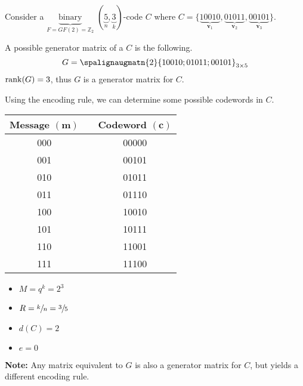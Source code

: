 
\begin{Example}{}{}
    Consider a $ \underbrace{\text{binary}}_{F=GF(2)=\mathbb{Z}_2} $
    $ (\underbrace{5}_{n},\underbrace{3}_{k}) $-code $ C $
    where
    $ C=\{\underbrace{10010}_{\bm{v}_1},\underbrace{01011}_{\bm{v}_2},\underbrace{00101}_{\bm{v}_3}\} $.

    A possible generator matrix of a $ C $ is the following.
    \[ G=
        \spalignaugmatn{2}{
            1 0 0 1 0; 0 1 0 1 1; 0 0 1 0 1}_{3\times{}5}
    \]
    $ \operatorname{rank}(G)=3 $, thus $ G $ is a generator matrix for $ C $.

    Using the encoding rule, we can determine some possible codewords in $ C $.
    \begin{table}[H]
        \centering
        \begin{tabular}{@{}ccc@{}}
            Message $ (\bm{m}) $ & \textrightarrow{} & Codeword $ (\bm{c}) $ \\
            \midrule
            000                  & \textrightarrow{} & 00000                 \\
            001                  & \textrightarrow{} & 00101                 \\
            010                  & \textrightarrow{} & 01011                 \\
            011                  & \textrightarrow{} & 01110                 \\
            100                  & \textrightarrow{} & 10010                 \\
            101                  & \textrightarrow{} & 10111                 \\
            110                  & \textrightarrow{} & 11001                 \\
            111                  & \textrightarrow{} & 11100
        \end{tabular}
    \end{table}
    \begin{itemize}
        \item $ M=q^k=2^3 $
        \item $ R=\sfrac{k}{n}=\sfrac{3}{5} $
        \item $ d(C)=2 $
        \item $ e=0 $
    \end{itemize}
\end{Example}

\textbf{Note:} Any matrix equivalent to $ G $ is also a generator matrix
for $ C $, but yields a different encoding rule.

